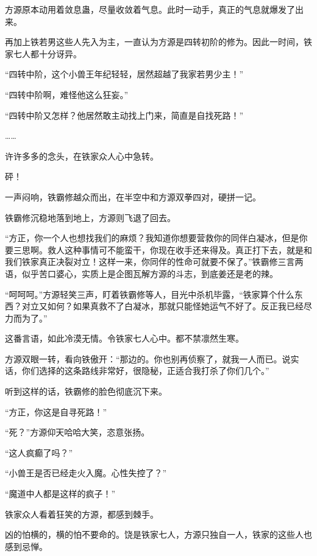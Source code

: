 
\begin{this_body}



方源原本动用着敛息蛊，尽量收敛着气息。此时一动手，真正的气息就爆发了出来。

再加上铁若男这些人先入为主，一直认为方源是四转初阶的修为。因此一时间，铁家七人都十分讶异。

“四转中阶，这个小兽王年纪轻轻，居然超越了我家若男少主！”

“四转中阶啊，难怪他这么狂妄。”

“四转中阶又怎样？他居然敢主动找上门来，简直是自找死路！”

……

许许多多的念头，在铁家众人心中急转。

砰！

一声闷响，铁霸修越众而出，在半空中和方源双拳四对，硬拼一记。

铁霸修沉稳地落到地上，方源则飞退了回去。

“方正，你一个人也想找我们的麻烦？我知道你想要营救你的同伴白凝冰，但是你要三思啊。救人这种事情可不能蛮干，你现在收手还来得及。真正打下去，就是和我们铁家真正决裂对立！这样一来，你同伴的性命可就要不保了。”铁霸修三言两语，似乎苦口婆心，实质上是企图瓦解方源的斗志，到底姜还是老的辣。

“呵呵呵。”方源轻笑三声，盯着铁霸修等人，目光中杀机毕露，“铁家算个什么东西？对立又如何？如果真救不了白凝冰，那就只能怪她运气不好了。反正我已经尽力而为了。”

这番言语，如此冷漠无情。令铁家七人心中。都不禁凛然生寒。

方源双眼一转，看向铁傲开：“那边的。你也别再侦察了，就我一人而已。说实话，你们选择的这条路线非常好，很隐秘，正适合我打杀了你们几个。”

听到这样的话，铁霸修的脸色彻底沉下来。

“方正，你这是自寻死路！”

“死？”方源仰天哈哈大笑，恣意张扬。

“这人疯癫了吗？”

“小兽王是否已经走火入魔。心性失控了？”

“魔道中人都是这样的疯子！”

铁家众人看着狂笑的方源，都感到棘手。

凶的怕横的，横的怕不要命的。饶是铁家七人，方源只独自一人，铁家的这些人也感到忌惮。


\end{this_body}
